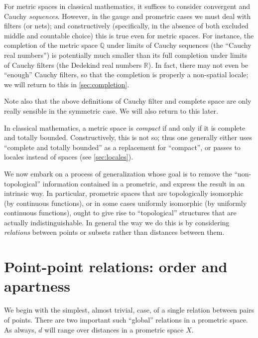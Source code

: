 \documentclass{article}
\def\R{\mathbb{R}}
\begin{document}
For metric spaces in classical mathematics, it suffices to consider convergent and Cauchy \emph{sequences}.
However, in the gauge and prometric cases we must deal with filters (or nets); and constructively (specifically, in the absence of both excluded middle and countable choice) this is true even for metric spaces.
For instance, the completion of the metric space $\mathbb{Q}$ under limits of Cauchy sequences (the ``Cauchy real numbers'') is potentially much smaller than its full completion under limits of Cauchy filters (the Dedekind real numbers $\R$).
In fact, there may not even be ``enough'' Cauchy filters, so that the completion is properly a non-spatial locale; we will return to this in \cref{sec:completion}.

Note also that the above definitions of Cauchy filter and complete space are only really sensible in the symmetric case.
We will also return to this later.

In classical mathematics, a metric space is \emph{compact} if and only if it is complete and totally bounded.
Constructively, this is not so; thus one generally either uses ``complete and totally bounded'' as a replacement for ``compact'', or passes to locales instead of spaces (see \cref{sec:locales}).


We now embark on a process of generalization whose goal is to remove the ``non-topological'' information contained in a prometric, and express the result in an intrinsic way.
In particular, prometric spaces that are topologically isomorphic (by continuous functions), or in some cases uniformly isomorphic (by uniformly continuous functions), ought to give rise to ``topological'' structures that are actually indistinguishable.
In general the way we do this is by considering \emph{relations} between points or subsets rather than distances between them.


\section{Point-point relations: order and apartness}
\label{sec:point-point}
\label{sec:order}

We begin with the simplest, almost trivial, case, of a single relation between pairs of points.
There are two important such ``global'' relations in a prometric space.
As always, $d$ will range over distances in a prometric space $X$.
\end{document}
